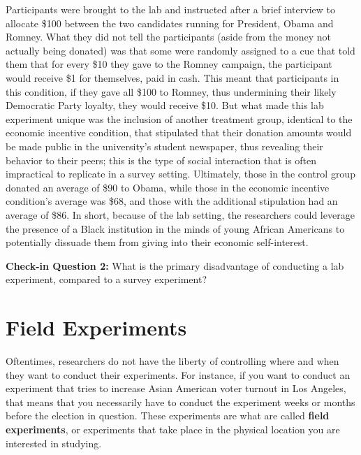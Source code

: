 \documentclass{book}
\newenvironment{shaded*}{
    \begin{center}
    \begin{tabular}{|p{0.9\textwidth}|}
    \hline\\
    }
    { 
    \\\\\hline
    \end{tabular} 
    \end{center}
}
\begin{document}
Participants were brought to the lab and instructed after a brief interview to
allocate \$100 between the two candidates running for President, Obama and
Romney. What they did not tell the participants (aside from the money not
actually being donated) was that some were randomly assigned to a cue that
told them that for every \$10 they gave to the Romney campaign, the
participant would receive \$1 for themselves, paid in cash. This meant that
participants in this condition, if they gave all \$100 to Romney, thus
undermining their likely Democratic Party loyalty, they would receive \$10.
But what made this lab experiment unique was the inclusion of another
treatment group, identical to the economic incentive condition, that
stipulated that their donation amounts would be made public in the
university's student newspaper, thus revealing their behavior to their peers;
this is the type of social interaction that is often impractical to replicate
in a survey setting. Ultimately, those in the control group donated an average
of \$90 to Obama, while those in the economic incentive condition's average
was \$68, and those with the additional stipulation had an average of \$86. In
short, because of the lab setting, the researchers could leverage the presence
of a Black institution in the minds of young African Americans to potentially
dissuade them from giving into their economic self-interest.

\begin{shaded*}

\textbf{Check-in Question 2:} What is the primary disadvantage of conducting a
lab experiment, compared to a survey experiment?

\end{shaded*}

\hypertarget{field-experiments}{%
\section{Field Experiments}\label{field-experiments}}

Oftentimes, researchers do not have the liberty of controlling where and when
they want to conduct their experiments. For instance, if you want to conduct
an experiment that tries to increase Asian American voter turnout in Los
Angeles, that means that you necessarily have to conduct the experiment weeks
or months before the election in question. These experiments are what are
called \textbf{field experiments}, or experiments that take place in the
physical location you are interested in studying.
\end{document}
